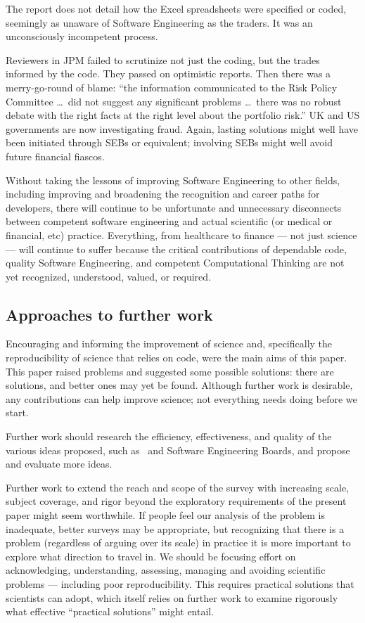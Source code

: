 \documentclass{comjnl}
\begin{document}
The report \cite{jpm} does not detail how the Excel spreadsheets were specified or coded, seemingly as unaware of Software Engineering as the traders. It was an unconsciously incompetent process. 

Reviewers in JPM failed to scrutinize not just the coding, but the trades informed by the code. They passed on optimistic reports. Then there was a merry-go-round of blame: ``the information communicated to the Risk Policy Committee \ldots\ did not suggest any significant problems \ldots\ there was no robust debate with the right facts at the right level about the portfolio risk.'' UK and US governments are now investigating fraud. Again, lasting solutions might well have been initiated through SEBs or equivalent; involving SEBs might well avoid future financial fiascos.

Without taking the lessons of improving Software Engineering to other fields, including improving and broadening the recognition and career paths for developers, there will continue to be unfortunate and unnecessary disconnects between competent software engineering and actual scientific (or medical or financial, etc) practice. Everything, from healthcare to finance --- not just science --- will continue to suffer because the critical contributions of dependable code, quality Software Engineering, and competent Computational Thinking are not yet recognized, understood, valued, or required. 

\subsection{Approaches to further work}
Encouraging and informing the improvement of science and, specifically the reproducibility of science that relies on code, were the main aims of this paper. This paper raised problems and suggested some possible solutions: there are solutions, and better ones may yet be found. Although further work is desirable, any contributions can help improve science; not everything needs doing before we start.

Further work should research the efficiency, effectiveness, and quality of the various ideas proposed, such as \RAPstar\ and Software Engineering Boards, and propose and evaluate more ideas.

Further work to extend the reach and scope of the survey with increasing scale, subject coverage, and rigor beyond the exploratory requirements of the present paper might seem worthwhile. If people feel our analysis of the problem is inadequate, better surveys may be appropriate, but recognizing that there is a problem (regardless of arguing over its scale) in practice it is more important to explore what direction to travel in. We should be focusing effort on acknowledging, understanding, assessing, managing and avoiding scientific problems --- including poor reproducibility. This requires practical solutions that scientists can adopt, which itself relies on further work to examine rigorously what effective ``practical solutions'' might entail.
\end{document}
